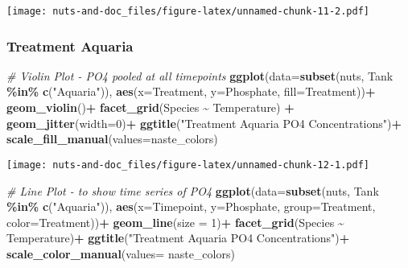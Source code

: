 \documentclass[
]{article}
\newenvironment{Shaded}{\begin{snugshade}}{\end{snugshade}}
\newcommand{\AttributeTok}[1]{\textcolor[rgb]{0.13,0.29,0.53}{#1}}
\newcommand{\CommentTok}[1]{\textcolor[rgb]{0.56,0.35,0.01}{\textit{#1}}}
\newcommand{\DecValTok}[1]{\textcolor[rgb]{0.00,0.00,0.81}{#1}}
\newcommand{\FunctionTok}[1]{\textcolor[rgb]{0.13,0.29,0.53}{\textbf{#1}}}
\newcommand{\NormalTok}[1]{#1}
\newcommand{\SpecialCharTok}[1]{\textcolor[rgb]{0.81,0.36,0.00}{\textbf{#1}}}
\newcommand{\StringTok}[1]{\textcolor[rgb]{0.31,0.60,0.02}{#1}}
\begin{document}
\texttt{[image: nuts-and-doc\_files/figure-latex/unnamed-chunk-11-2.pdf]}

\hypertarget{treatment-aquaria-2}{%
\subsubsection{Treatment Aquaria}\label{treatment-aquaria-2}}

\begin{Shaded}
\begin{Highlighting}[]
\CommentTok{\# Violin Plot {-} PO4 pooled at all timepoints}
\FunctionTok{ggplot}\NormalTok{(}\AttributeTok{data=}\FunctionTok{subset}\NormalTok{(nuts, Tank }\SpecialCharTok{\%in\%} \FunctionTok{c}\NormalTok{(}\StringTok{"Aquaria"}\NormalTok{)), }\FunctionTok{aes}\NormalTok{(}\AttributeTok{x=}\NormalTok{Treatment, }\AttributeTok{y=}\NormalTok{Phosphate, }\AttributeTok{fill=}\NormalTok{Treatment))}\SpecialCharTok{+}
  \FunctionTok{geom\_violin}\NormalTok{()}\SpecialCharTok{+}
  \FunctionTok{facet\_grid}\NormalTok{(Species }\SpecialCharTok{\textasciitilde{}}\NormalTok{ Temperature) }\SpecialCharTok{+}
  \FunctionTok{geom\_jitter}\NormalTok{(}\AttributeTok{width=}\DecValTok{0}\NormalTok{)}\SpecialCharTok{+}
  \FunctionTok{ggtitle}\NormalTok{(}\StringTok{"Treatment Aquaria PO4 Concentrations"}\NormalTok{)}\SpecialCharTok{+}
  \FunctionTok{scale\_fill\_manual}\NormalTok{(}\AttributeTok{values=}\NormalTok{naste\_colors)}
\end{Highlighting}
\end{Shaded}

\texttt{[image: nuts-and-doc\_files/figure-latex/unnamed-chunk-12-1.pdf]}

\begin{Shaded}
\begin{Highlighting}[]
\CommentTok{\# Line Plot {-} to show time series of PO4}
\FunctionTok{ggplot}\NormalTok{(}\AttributeTok{data=}\FunctionTok{subset}\NormalTok{(nuts, Tank }\SpecialCharTok{\%in\%} \FunctionTok{c}\NormalTok{(}\StringTok{"Aquaria"}\NormalTok{)), }\FunctionTok{aes}\NormalTok{(}\AttributeTok{x=}\NormalTok{Timepoint, }\AttributeTok{y=}\NormalTok{Phosphate, }\AttributeTok{group=}\NormalTok{Treatment, }\AttributeTok{color=}\NormalTok{Treatment))}\SpecialCharTok{+}
  \FunctionTok{geom\_line}\NormalTok{(}\AttributeTok{size =} \DecValTok{1}\NormalTok{)}\SpecialCharTok{+}
  \FunctionTok{facet\_grid}\NormalTok{(Species }\SpecialCharTok{\textasciitilde{}}\NormalTok{ Temperature)}\SpecialCharTok{+}
  \FunctionTok{ggtitle}\NormalTok{(}\StringTok{"Treatment Aquaria PO4 Concentrations"}\NormalTok{)}\SpecialCharTok{+}
  \FunctionTok{scale\_color\_manual}\NormalTok{(}\AttributeTok{values=}\NormalTok{ naste\_colors)}
\end{Highlighting}
\end{Shaded}
\end{document}
